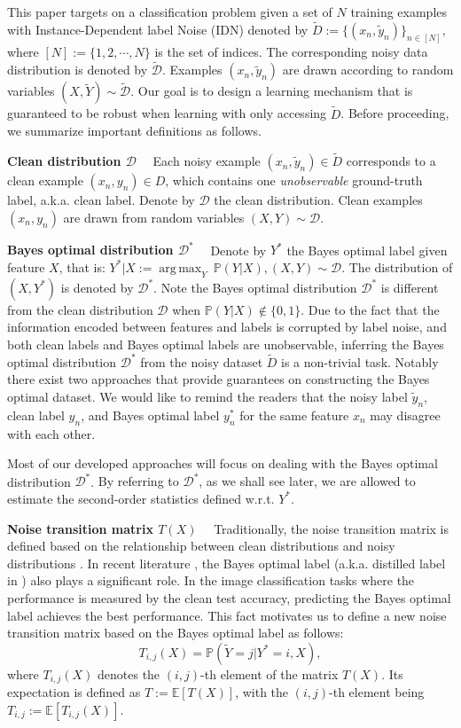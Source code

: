 \documentclass[final]{cvpr}
\DeclareMathOperator*{\argmax}{arg\,max}
\newcommand{\PP}{\mathbb P}
\newcommand{\E}{\mathbb E}
\newcommand{\rev}[1]{{\color{blue}#1}}
\newcommand{\rev}[1]{#1}
\begin{document}
This paper targets on a classification problem given a set of $N$ training examples with Instance-Dependent label Noise (IDN) denoted by $\widetilde D:=\{( x_n,\tilde y_n)\}_{n\in  [N]}$, where $[N] := \{1,2,\cdots,N\}$ is the set of indices.
The corresponding noisy data distribution is denoted by $\widetilde{\mathcal D}$.
Examples $(x_n,\tilde y_n)$ are drawn according to random variables $(X,\widetilde Y) \sim \widetilde{\mathcal D}$. 
Our goal is to design a learning mechanism that is guaranteed to be robust when learning with only accessing $\widetilde D$.
Before proceeding, we summarize important definitions as follows.

\noindent\textbf{Clean distribution $\mathcal D$}~~
Each noisy example $(x_n,\tilde y_n)\in\widetilde D$ corresponds to a clean example $(x_n,y_n) \in D$, which contains one \emph{unobservable} ground-truth label, a.k.a. clean label.
Denote by $\mathcal D$ the clean distribution. Clean examples $(x_n,y_n)$ are drawn from random variables $(X,Y)\sim \mathcal D$.

\noindent\textbf{Bayes optimal distribution $\mathcal D^*$}~~
Denote by $Y^*$ the Bayes optimal label given feature $X$, that is:
$
Y^*|X := \argmax_Y ~\PP(Y|X), (X,Y)\sim \mathcal D.
$
The distribution of $(X,Y^*)$ is denoted by $\mathcal D^*$. Note the Bayes optimal distribution $\mathcal D^*$ is different from the clean distribution $\mathcal D$ when $\PP(Y|X) \notin \{0,1\}$.
Due to the fact that the information encoded between features and labels is corrupted by label noise, and both clean labels and Bayes optimal labels are unobservable, inferring the Bayes optimal distribution $\mathcal D^*$ from the noisy dataset $\widetilde D$ is a non-trivial task.
\rev{Notably there exist two approaches \cite{sieve2020,cheng2017learningdistill} that provide guarantees on constructing the Bayes optimal dataset. We would like to remind the readers that the noisy label $\tilde y_n$, clean label $y_n$, and Bayes optimal label $y_n^*$ for the same feature $x_n$ may disagree with each other.}

Most of our developed approaches will focus on dealing with the Bayes optimal distribution $\mathcal D^*$. 
{By referring to $\mathcal D^*$, as we shall see later, we are allowed to estimate the second-order statistics defined w.r.t. $Y^*$.} 

\noindent\textbf{Noise transition matrix $T(X)$}~~
Traditionally, the noise transition matrix is defined based on the relationship between clean distributions and noisy distributions \cite{sieve2020,liu2019peer,Patrini_2017_CVPR,xia2020parts}.
In recent literature \cite{cheng2017learningdistill}, the Bayes optimal label (a.k.a. distilled label in \cite{cheng2017learningdistill}) also plays a significant role.
In the image classification tasks where the performance is measured by the clean test accuracy, predicting the Bayes optimal label achieves the best performance. 
This fact motivates us to define a new noise transition matrix based on the Bayes optimal label as follows:
\[
T_{i,j}(X) = \PP( \widetilde Y = j | Y^* = i,X),
\]
where $T_{i,j}(X)$ denotes the $(i,j)$-th element of the matrix $T(X)$. 
Its expectation is defined as $T:= \E [T(X)]$, with the $(i,j)$-th element being $T_{i,j}:= \E[T_{i,j}(X)]$.
\end{document}
